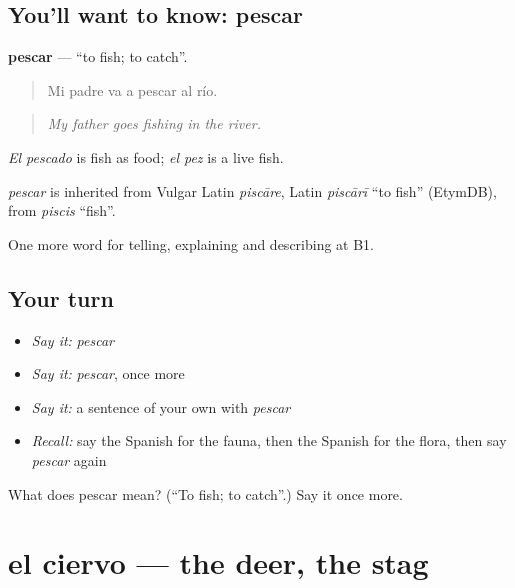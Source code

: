 \subsection*{You'll want to know: pescar}
\textbf{pescar} — \textquotedblleft{}to fish; to catch\textquotedblright{}.

\begin{quote}
Mi padre va a pescar al río.
\end{quote}

\begin{quote}
\emph{My father goes fishing in the river.}
\end{quote}

\emph{El pescado} is fish as food; \emph{el pez} is a live fish.

\begin{cousinweb}
\emph{pescar} is inherited from Vulgar Latin \emph{piscāre}, Latin \emph{piscārī} \textquotedblleft{}to fish\textquotedblright{} (EtymDB), from \emph{piscis} \textquotedblleft{}fish\textquotedblright{}.
\end{cousinweb}

\begin{grammarlens}[title={What you've built}]
One more word for telling, explaining and describing at B1.
\end{grammarlens}

\subsection*{Your turn}
\begin{itemize}
\raggedright
  \item \emph{Say it:} \emph{pescar}
  \item \emph{Say it:} \emph{pescar}, once more
  \item \emph{Say it:} a sentence of your own with \emph{pescar}
  \item \emph{Recall:} say the Spanish for the fauna, then the Spanish for the flora, then say \emph{pescar} again
\end{itemize}

\begin{tcolorbox}[breakable,colback=teal!4,colframe=teal!35!black,title={Before you move on}]
What does pescar mean? (\textquotedblleft{}To fish; to catch\textquotedblright{}.) Say it once more.
\end{tcolorbox}
\section[el ciervo]{el ciervo — the deer, the stag}

